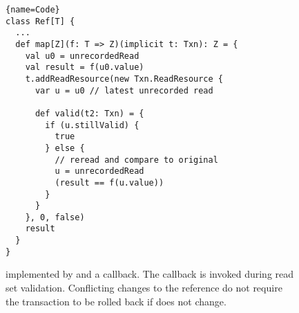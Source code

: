 \begin{figure}
\begin{lstlisting}{name=Code}
class Ref[T] {
  ...
  def map[Z](f: T => Z)(implicit t: Txn): Z = {
    val u0 = unrecordedRead
    val result = f(u0.value)
    t.addReadResource(new Txn.ReadResource {
      var u = u0 // latest unrecorded read
  
      def valid(t2: Txn) = {
        if (u.stillValid) {
          true
        } else {
          // reread and compare to original
          u = unrecordedRead
          (result == f(u.value))
        }
      }
    }, 0, false)
    result
  }
}
\end{lstlisting}

\caption{ implemented by 
and a  callback.  The callback is invoked during read
set validation.  Conflicting changes to the reference do not require
the transaction to be rolled back if  does not change.}

\label{fig:map}
\end{figure}
